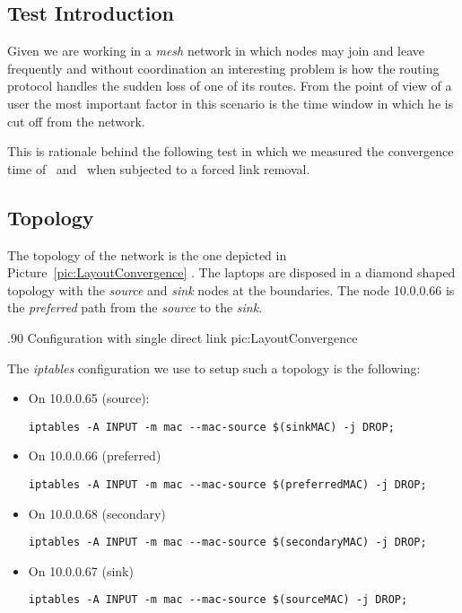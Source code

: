 \clearpage
\subsection{Test Introduction}
Given we are working in a \emph{mesh} network in which nodes may join
and leave frequently and without coordination an interesting problem
is how the routing protocol handles the sudden loss of one of its
routes. From the point of view of a user the most important factor in
this scenario is the time window in which he is cut off from the
network.

This is rationale behind the following test in which we measured the
convergence time of \batman\ and \olsr\ when subjected to a forced
link removal.

\subsection{Topology}
 The topology of the network is the one depicted in
Picture~\ref{pic:LayoutConvergence} . The laptops are disposed in a
diamond shaped topology with the \emph{source} and \emph{sink} nodes
at the boundaries. The node 10.0.0.66 is the \emph{preferred} path
from the \emph{source} to the \emph{sink}.

        {.90\columnwidth}
        {Configuration with single direct link}
        {pic:LayoutConvergence}

The \emph{iptables} configuration we use to setup such a topology is
the following:

\begin{itemize}
\item On 10.0.0.65 (source):

\begin{verbatim}
iptables -A INPUT -m mac --mac-source $(sinkMAC) -j DROP;
\end{verbatim}

\item On 10.0.0.66 (preferred)
\begin{verbatim}
iptables -A INPUT -m mac --mac-source $(preferredMAC) -j DROP;
\end{verbatim}

\item On 10.0.0.68 (secondary)
\begin{verbatim}
iptables -A INPUT -m mac --mac-source $(secondaryMAC) -j DROP;
\end{verbatim}

\item On 10.0.0.67 (sink)
\begin{verbatim}
iptables -A INPUT -m mac --mac-source $(sourceMAC) -j DROP;
\end{verbatim}
\end{itemize}

